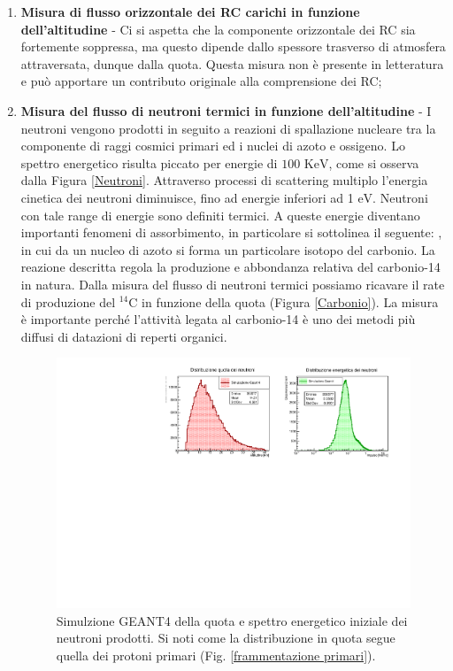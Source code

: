 \begin{enumerate}
    \item \textbf{Misura di flusso orizzontale dei RC carichi in funzione dell'altitudine} - Ci si aspetta che la componente orizzontale dei RC sia fortemente soppressa, ma questo dipende dallo spessore trasverso di atmosfera attraversata, dunque dalla quota. Questa misura non è presente in letteratura e può apportare un contributo originale alla comprensione dei RC;
    \item \textbf{Misura del flusso di neutroni termici in funzione dell'altitudine} - I neutroni vengono prodotti in seguito a reazioni di spallazione nucleare tra la componente di raggi cosmici primari ed i nuclei di azoto e ossigeno. Lo spettro energetico risulta piccato per energie di $100\text{ KeV}$, come si osserva dalla Figura \ref{Neutroni}. Attraverso processi di scattering multiplo l'energia cinetica dei neutroni diminuisce, fino ad energie inferiori ad 1 $\text{eV}$. Neutroni con tale range di energie sono definiti termici. A queste energie diventano importanti fenomeni di assorbimento, in particolare si sottolinea il seguente:
, in cui da un nucleo di azoto si forma un particolare isotopo del carbonio. La reazione descritta regola la produzione e abbondanza relativa del carbonio-14 in natura. Dalla misura del flusso di neutroni termici possiamo ricavare il rate di produzione del $^{14}\text{C}$ in funzione della quota (Figura \ref{Carbonio}).
La misura è importante perché l'attività legata al carbonio-14 è uno dei metodi più diffusi di datazioni di reperti organici. 
\begin{figure}
    \centering
    \includegraphics[width=.9\linewidth]{Neutroni.pdf}
    \caption{Simulzione GEANT4 della quota e spettro energetico iniziale dei neutroni prodotti. Si noti come la distribuzione in quota segue quella dei protoni primari (Fig. \ref{frammentazione primari}).}

\end{figure}
\end{enumerate}
